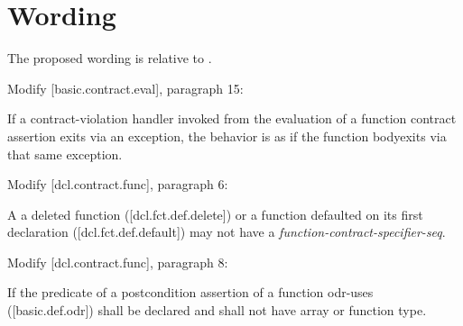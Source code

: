 \section{Wording}

The proposed wording is relative to \cite{P2900R8}.

Modify [basic.contract.eval], paragraph 15:
\begin{adjustwidth}{0.5cm}{0.5cm}
If a contract-violation handler invoked from the evaluation of a function contract assertion exits via an exception, the behavior is as if the function bodyexits via that same exception.
\end{adjustwidth}

Modify [dcl.contract.func], paragraph 6:
\begin{adjustwidth}{0.5cm}{0.5cm}
A a deleted function ([dcl.fct.def.delete])\removed{,} or a function defaulted on its first declaration ([dcl.fct.def.default]) may not have a \emph{function-contract-specifier-seq}.
\end{adjustwidth}

Modify [dcl.contract.func], paragraph 8:
\begin{adjustwidth}{0.5cm}{0.5cm}
If the predicate of a postcondition assertion of a function odr-uses ([basic.def.odr])  shall be declared  and shall not have array or function type.
\end{adjustwidth}

%
%
%
%

